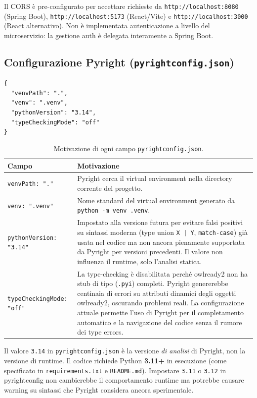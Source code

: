 \documentclass[a4paper,12pt]{article}
\begin{document}
\noindent Il CORS \`{e} pre-configurato per accettare richieste da
\texttt{http://localhost:8080} (Spring Boot), \texttt{http://localhost:5173}
(React/Vite) e \texttt{http://localhost:3000} (React alternativo).
Non \`{e} implementata autenticazione a livello del microservizio:
la gestione auth \`{e} delegata interamente a Spring Boot.

\subsection{Configurazione Pyright (\texttt{pyrightconfig.json})}

\begin{lstlisting}[caption={\texttt{pyrightconfig.json} --- configurazione del type checker.}]
{
  "venvPath": ".",
  "venv": ".venv",
  "pythonVersion": "3.14",
  "typeCheckingMode": "off"
}
\end{lstlisting}

\noindent \begin{table}[H]
\centering
\caption{Motivazione di ogni campo \texttt{pyrightconfig.json}.}
\begin{tabular}{L{4cm} L{8.5cm}}
\toprule
\textbf{Campo} & \textbf{Motivazione} \\
\midrule
\texttt{venvPath: "."} &
  Pyright cerca il virtual environment nella directory corrente del progetto. \\[3pt]
\texttt{venv: ".venv"} &
  Nome standard del virtual environment generato da \texttt{python -m venv .venv}. \\[3pt]
\texttt{pythonVersion: "3.14"} &
  Impostato alla versione futura per evitare falsi positivi su sintassi
  moderna (type union \texttt{X | Y}, \texttt{match-case}) gi\`{a} usata
  nel codice ma non ancora pienamente supportata da Pyright per versioni
  precedenti. Il valore non influenza il runtime, solo l'analisi statica. \\[3pt]
\texttt{typeCheckingMode: "off"} &
  La type-checking \`{e} disabilitata perch\'{e} owlready2 non ha stub
  di tipo (\texttt{.pyi}) completi. Pyright genererebbe centinaia di
  errori su attributi dinamici degli oggetti owlready2, oscurando
  problemi reali. La configurazione attuale permette l'uso di Pyright
  per il completamento automatico e la navigazione del codice senza
  il rumore dei type errors. \\
\bottomrule
\end{tabular}
\end{table}

\begin{warningbox}
Il valore \texttt{3.14} in \texttt{pyrightconfig.json} \`{e} la versione
\textit{di analisi} di Pyright, non la versione di runtime. Il codice
richiede Python \textbf{3.11+} in esecuzione (come specificato in
\texttt{requirements.txt} e \texttt{README.md}). Impostare
\texttt{3.11} o \texttt{3.12} in pyrightconfig non cambierebbe il
comportamento runtime ma potrebbe causare warning su sintassi che
Pyright considera ancora sperimentale.
\end{warningbox}
\end{document}
